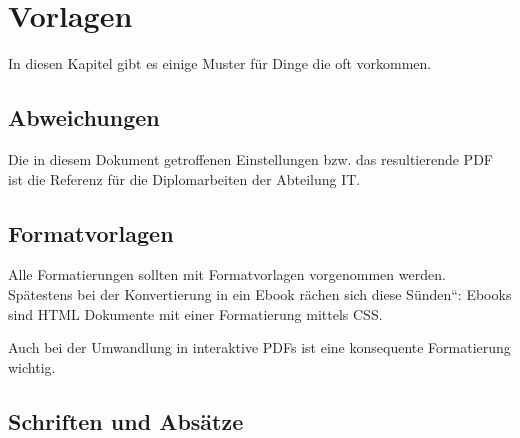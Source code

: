 
\section{Vorlagen}

In diesen Kapitel gibt es einige Muster für Dinge die oft vorkommen.

\subsection{Abweichungen}

Die in diesem Dokument getroffenen Einstellungen bzw. das resultierende PDF ist die 
Referenz für die Diplomarbeiten der Abteilung IT. 


\subsection{Formatvorlagen}

Alle Formatierungen sollten mit Formatvorlagen vorgenommen werden.
Spätestens bei der Konvertierung in ein Ebook rächen sich diese \quotedblbase Sünden``:
Ebooks sind HTML Dokumente mit einer Formatierung mittels CSS.

Auch bei der Umwandlung in interaktive PDFs ist eine konsequente Formatierung
wichtig.


\subsection{Schriften und Absätze}

